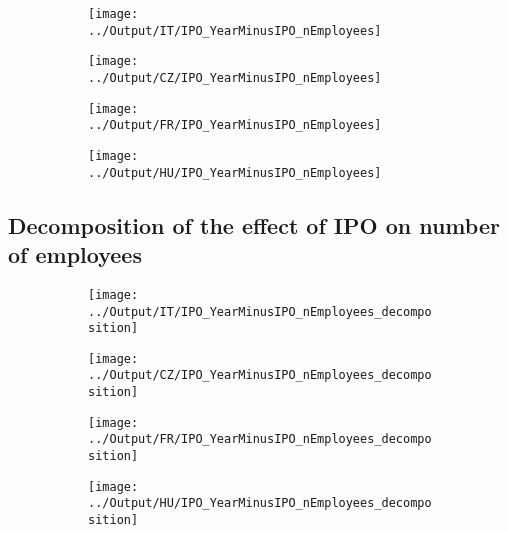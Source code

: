 \documentclass[12pt,notitlepage]{article}
\begin{document}
\begin{figure}[!htpb]
\centering
\caption{IPO and Number of Employees}
\begin{subfigure}{.49\textwidth}
    \centering
 \texttt{[image: ../Output/IT/IPO\_YearMinusIPO\_nEmployees]}
\end{subfigure}%
\begin{subfigure}{.49\textwidth}
    \centering
 \texttt{[image: ../Output/CZ/IPO\_YearMinusIPO\_nEmployees]}
\end{subfigure}
\begin{subfigure}{.49\textwidth}
    \centering
 \texttt{[image: ../Output/FR/IPO\_YearMinusIPO\_nEmployees]}
\end{subfigure}%
\begin{subfigure}{.49\textwidth}
    \centering
 \texttt{[image: ../Output/HU/IPO\_YearMinusIPO\_nEmployees]}
\end{subfigure}
\end{figure}
\pagebreak

\subsection*{Decomposition of the effect of IPO on number of employees}
\begin{figure}[!htpb]
\centering
\caption{IPO and Number of Employees- Decomposition}
\begin{subfigure}{.49\textwidth}
    \centering
 \texttt{[image: ../Output/IT/IPO\_YearMinusIPO\_nEmployees\_decomposition]}
\end{subfigure}%
\begin{subfigure}{.49\textwidth}
    \centering
 \texttt{[image: ../Output/CZ/IPO\_YearMinusIPO\_nEmployees\_decomposition]}
\end{subfigure}
\begin{subfigure}{.49\textwidth}
    \centering
 \texttt{[image: ../Output/FR/IPO\_YearMinusIPO\_nEmployees\_decomposition]}
\end{subfigure}%
\begin{subfigure}{.49\textwidth}
    \centering
 \texttt{[image: ../Output/HU/IPO\_YearMinusIPO\_nEmployees\_decomposition]}
\end{subfigure}
\end{figure}
\pagebreak
\end{document}
